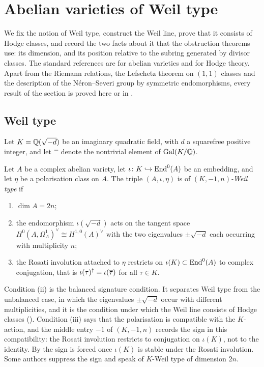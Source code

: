 \section{Abelian varieties of Weil type}\label{sec:weiltype}

We fix the notion of Weil type, construct the Weil line, prove that it
consists of Hodge classes, and record the two facts about it that the
obstruction theorems use: its dimension, and its position relative to the
subring generated by divisor classes. The standard references are \cite{BL04}
for abelian varieties and \cite{Voi02} for Hodge theory. Apart from the
Riemann relations, the Lefschetz theorem on $(1,1)$ classes and the
description of the N\'eron--Severi group by symmetric endomorphisms, every
result of the section is proved here or in .

\subsection{Weil type}

Let $K=\mathbb{Q}(\sqrt{-d})$ be an imaginary quadratic field, with $d$ a squarefree
positive integer, and let $\overline{\phantom{x}}$ denote the nontrivial element
of $\operatorname{Gal}(K/\mathbb{Q})$.

\begin{definition}\label{def:weiltype}
Let $A$ be a complex abelian variety, let
$\iota\colon K\hookrightarrow\operatorname{End}^{0}(A)$ be an embedding, and let $\eta$ be a
polarisation class on $A$. The triple $(A,\iota,\eta)$ is of
\emph{$(K,-1,n)$-Weil type} if
\begin{enumerate}[label=\textup{(\roman*)},nosep]
\item $\dim A=2n$;
\item the endomorphism $\iota(\sqrt{-d})$ acts on the tangent space
  $H^{0}(A,\Omega^{1}_{A})^{\vee}\cong H^{1,0}(A)^{\vee}$ with the two
  eigenvalues $\pm\sqrt{-d}$ each occurring with multiplicity $n$;
\item the Rosati involution attached to $\eta$ restricts on
  $\iota(K)\subset\operatorname{End}^{0}(A)$ to complex conjugation, that is
  $\iota(\tau)^{\dagger}=\iota(\overline{\tau})$ for all $\tau\in K$.
\end{enumerate}
\end{definition}

Condition (ii) is the balanced signature condition. It separates Weil type
from the unbalanced case, in which the eigenvalues $\pm\sqrt{-d}$ occur with
different multiplicities, and it is the condition under which the Weil line
consists of Hodge classes (). Condition (iii) says that
the polarisation is compatible with the $K$-action, and the middle entry $-1$
of $(K,-1,n)$ records the sign in this compatibility: the Rosati involution
restricts to conjugation on $\iota(K)$, not to the identity. By
 the sign is forced once $\iota(K)$ is stable under the
Rosati involution. Some authors suppress the sign and speak of $K$-Weil type
of dimension $2n$.

